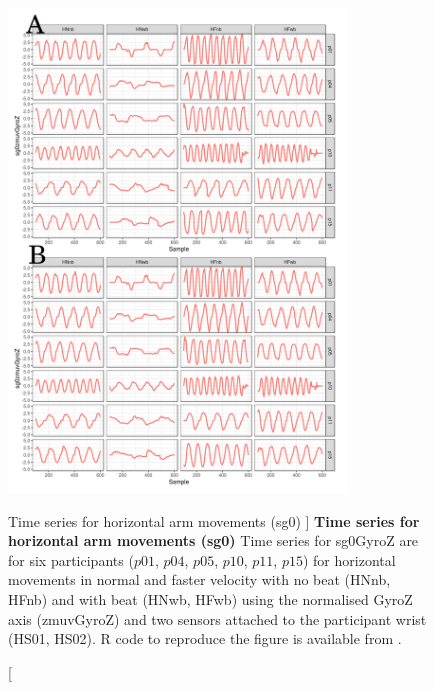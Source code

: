 \begin{figure}
\centering
\includegraphics[width=0.8\textwidth]{tssg0gyroZ}
    	\caption
	[Time series for horizontal arm movements (sg0) ]{
	{\bf Time series for horizontal arm movements (sg0)}
		Time series for sg0GyroZ  are for six participants 
		($p01$, $p04$, $p05$, $p10$, $p11$, $p15$) 
		for horizontal movements in normal and faster velocity with
		no beat	(HNnb, HFnb) and with beat (HNwb, HFwb) using 
		the normalised GyroZ axis (zmuvGyroZ) and 
		two sensors attached to the participant wrist (HS01, HS02).
	R code to reproduce the figure is available from \cite{xochicale2018}.
        }
    \label{fig:tssg0gyroZ-hii}
\end{figure}


